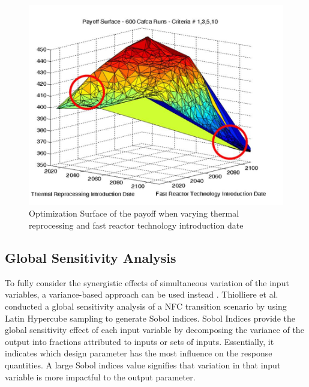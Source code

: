 \begin{figure}[]
	\begin{center}
		\includegraphics[scale=0.25]{./figures/passerini_payoff.jpg}
	\end{center}	
		\caption{Optimization Surface of the payoff when varying thermal 
		reprocessing and fast reactor technology introduction date
		\cite{passerini_systematic_2014}}
	\label{fig:passerini_payoff}
\end{figure} 

\subsection{Global Sensitivity Analysis}
\label{sec:sobol}
To fully consider the synergistic effects of
simultaneous variation of the input variables, a variance-based 
approach can be used instead \cite{thiolliere_methodology_2018}.
Thiolliere et al. conducted a global sensitivity analysis of a 
\gls{NFC} transition scenario by using Latin Hypercube sampling 
to generate Sobol indices. 
Sobol Indices provide the global sensitivity effect of each 
input variable by decomposing the variance of the output into 
fractions attributed to inputs or sets of inputs.
Essentially, it indicates which design parameter has 
the most influence on the response quantities.
A large Sobol indices value signifies that variation in that input 
variable is more impactful to the output parameter.

